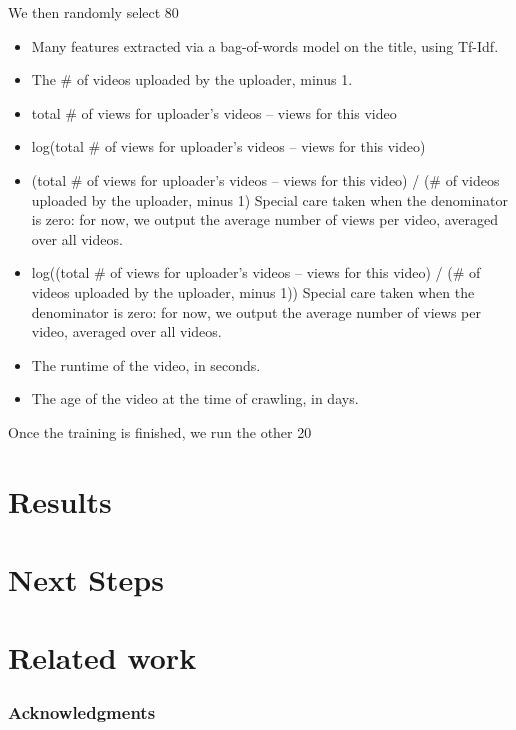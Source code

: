 \documentclass{article} %
\begin{document}
We then randomly select 80%

\begin{itemize}
\item
Many features extracted via a bag-of-words model on the title, using Tf-Idf.
\item
The \# of videos uploaded by the uploader, minus 1.
\item
total \# of views for uploader's videos – views for this video
\item
log(total \# of views for uploader's videos – views for this video)
\item
(total \# of views for uploader's videos – views for this video) / (\# of videos uploaded by the uploader, minus 1)
Special care taken when the denominator is zero: for now, we output the average number of views per video, averaged over all videos.
\item
log((total \# of views for uploader's videos – views for this video) / (\# of videos uploaded by the uploader, minus 1))
Special care taken when the denominator is zero: for now, we output the average number of views per video, averaged over all videos.
\item
The runtime of the video, in seconds.
\item
The age of the video at the time of crawling, in days.
\end{itemize}

Once the training is finished, we run the other 20%

\section{Results}

\section{Next Steps}

\section{Related work}

\subsubsection*{Acknowledgments}
\end{document}

